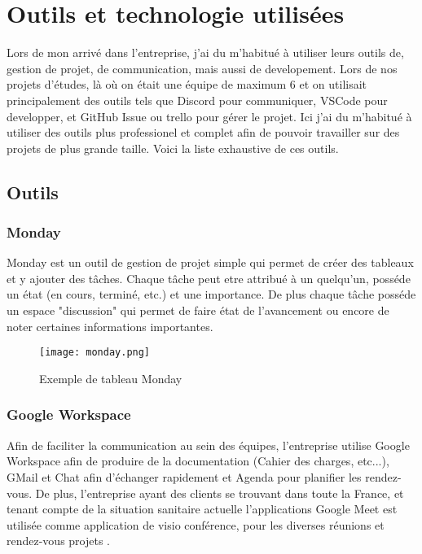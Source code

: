\section{Outils et technologie utilisées}


Lors de mon arrivé dans l'entreprise, j'ai du m'habitué à utiliser leurs outils de, gestion de projet, de communication, mais aussi de developement. Lors de nos projets d'études, là où on était une équipe de maximum 6 et on utilisait principalement des outils tels que Discord pour communiquer, VSCode pour developper, et GitHub Issue ou trello pour gérer le projet. Ici j'ai du m'habitué à utiliser des outils plus professionel et complet afin de pouvoir travailler sur des projets de plus grande taille. Voici la liste exhaustive de ces outils. 
\subsection{Outils}

\subsubsection{Monday}

Monday est un outil de gestion de projet simple qui permet de créer des tableaux et y ajouter des tâches.
Chaque tâche peut etre attribué à un quelqu'un, posséde un état (en cours, terminé, etc.) et une importance.
De plus chaque tâche posséde un espace "discussion" qui permet de faire état de l'avancement ou encore de noter certaines informations importantes. 

\begin{figure}[htbp]
    \center
    \texttt{[image: monday.png]}
    \caption{Exemple de tableau Monday}
\end{figure}

\subsubsection{Google Workspace}
Afin de faciliter la communication au sein des équipes, l'entreprise utilise Google Workspace afin de produire de la documentation (Cahier des charges, etc...), GMail et Chat afin d'échanger rapidement et Agenda pour planifier les rendez-vous.
De plus, l'entreprise ayant des clients se trouvant dans toute la France, et tenant compte de la situation sanitaire actuelle  l'applications Google Meet est utilisée comme application de visio conférence, pour les diverses réunions et rendez-vous projets . 

